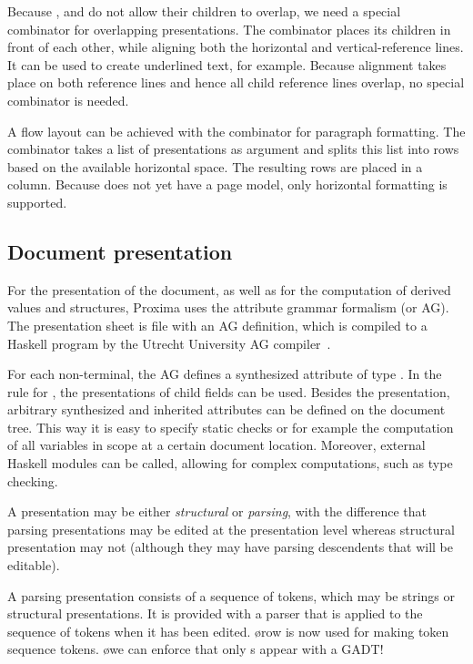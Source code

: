 \documentclass[12pt]{article}
\begin{document}
Because ,  and  do not allow their children to overlap, we need a special combinator for overlapping presentations. The  combinator places its children in front of each other, while aligning both the horizontal and vertical-reference lines. It can be used to create underlined text, for example. Because alignment takes place on both reference lines and hence all child reference lines overlap, no special  combinator is needed.

A flow layout can be achieved with the  combinator for paragraph formatting. The combinator takes a list of presentations as argument and splits this list into rows based on the available horizontal space. The resulting rows are placed in a column.  Because  does not yet have a page model, only horizontal formatting is supported. 
\ec

\subsection{Document presentation}

For the presentation of the document, as well as for the computation of derived values and structures, Proxima uses the attribute grammar formalism (or AG). The presentation sheet is file with an AG definition, which is compiled to a Haskell program by the Utrecht University AG compiler~\cite{swierstra08ag}.

For each non-terminal, the AG defines a synthesized attribute  of type . In the rule for , the presentations of child fields can be used. Besides the presentation, arbitrary synthesized and inherited attributes can be defined on the document tree. This way it is easy to specify static checks or for example the computation of all variables in scope at a certain document location. Moreover, external Haskell modules can be called, allowing for complex computations, such as type checking.


A presentation may be either {\em structural} or {\em parsing}, with the difference that parsing presentations may be edited at the presentation level whereas structural presentation may not (although they may have parsing descendents that will be editable). 

A parsing presentation consists of a sequence of tokens, which may be strings or structural presentations. It is provided with a parser that is applied to the sequence of tokens when it has been edited. 
\bl %
\o row is now used for making token sequence tokens.
\o we can enforce that only s appear with a GADT!
\el
\end{document}
